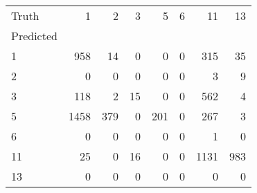 \begin{tabular}{lrrrrrrr}
\toprule
Truth & 1 & 2 & 3 & 5 & 6 & 11 & 13 \\
Predicted &  &  &  &  &  &  &  \\
\midrule
1 & 958 & 14 & 0 & 0 & 0 & 315 & 35 \\
2 & 0 & 0 & 0 & 0 & 0 & 3 & 9 \\
3 & 118 & 2 & 15 & 0 & 0 & 562 & 4 \\
5 & 1458 & 379 & 0 & 201 & 0 & 267 & 3 \\
6 & 0 & 0 & 0 & 0 & 0 & 1 & 0 \\
11 & 25 & 0 & 16 & 0 & 0 & 1131 & 983 \\
13 & 0 & 0 & 0 & 0 & 0 & 0 & 0 \\
\bottomrule
\end{tabular}
